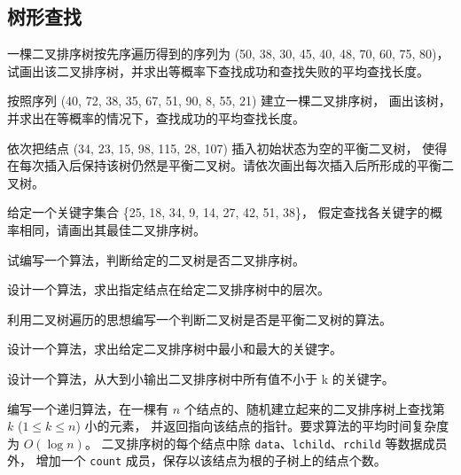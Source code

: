 \subsection{树形查找}

\begin{qitems}
    \begin{bbox}
        \qitem 一棵二叉排序树按先序遍历得到的序列为 (50, 38, 30, 45, 40, 48, 70, 60, 75, 80)，
        试画出该二叉排序树，并求出等概率下查找成功和查找失败的平均查找长度。
    \end{bbox}
    \begin{bbox}
        \qitem 按照序列 (40, 72, 38, 35, 67, 51, 90, 8, 55, 21) 建立一棵二叉排序树，
        画出该树，并求出在等概率的情况下，查找成功的平均查找长度。
    \end{bbox}
    \begin{bbox}
        \qitem 依次把结点 (34, 23, 15, 98, 115, 28, 107) 插入初始状态为空的平衡二叉树，
        使得在每次插入后保持该树仍然是平衡二叉树。请依次画出每次插入后所形成的平衡二叉树。
    \end{bbox}
    \begin{bbox}
        \qitem 给定一个关键字集合 \{25, 18, 34, 9, 14, 27, 42, 51, 38\}，
        假定查找各关键字的概率相同，请画出其最佳二叉排序树。
    \end{bbox}
    \begin{bbox}
        \qitem 试编写一个算法，判断给定的二叉树是否二叉排序树。
    \end{bbox}
    \begin{bbox}
        \qitem 设计一个算法，求出指定结点在给定二叉排序树中的层次。
    \end{bbox}
    \begin{bbox}
        \qitem 利用二叉树遍历的思想编写一个判断二叉树是否是平衡二叉树的算法。
    \end{bbox}
    \begin{bbox}
        \qitem 设计一个算法，求出给定二叉排序树中最小和最大的关键字。
    \end{bbox}
    \begin{bbox}
        \qitem 设计一个算法，从大到小输出二叉排序树中所有值不小于 k 的关键字。
    \end{bbox}
    \begin{bbox}
        \qitem 编写一个递归算法，在一棵有 $n$ 个结点的、随机建立起来的二叉排序树上查找第 $k$ ($1 \le k \le n$) 小的元素，
        并返回指向该结点的指针。要求算法的平均时间复杂度为 $O(\log n)$。
        二叉排序树的每个结点中除 \texttt{data}、\texttt{lchild}、\texttt{rchild} 等数据成员外，
        增加一个 \texttt{count} 成员，保存以该结点为根的子树上的结点个数。
    \end{bbox}
\end{qitems} 